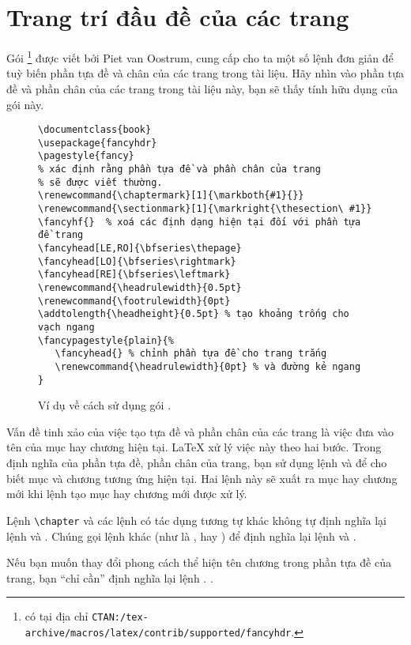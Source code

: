 \section{Trang trí đầu đề của các trang}
\label{sec:fancy} Gói \footnote{có tại địa chỉ \texttt{CTAN:/tex-archive/macros/latex/contrib/supported/fancyhdr}.} được viết bởi Piet van Oostrum, cung cấp cho ta một số lệnh đơn giản để tuỳ biến phần tựa đề và chân của các trang trong tài liệu. Hãy nhìn vào phần tựa đề và phần chân của các trang trong tài liệu này, bạn sẽ thấy tính hữu dụng của gói này.
\begin{figure}[!htbp]
\begin{lined}{\textwidth}
\begin{verbatim}
\documentclass{book}
\usepackage{fancyhdr}
\pagestyle{fancy}
% xác định rằng phần tựa đề và phần chân của trang
% sẽ được viết thường.
\renewcommand{\chaptermark}[1]{\markboth{#1}{}}
\renewcommand{\sectionmark}[1]{\markright{\thesection\ #1}}
\fancyhf{}  % xoá các định dạng hiện tại đối với phần tựa đề trang
\fancyhead[LE,RO]{\bfseries\thepage}
\fancyhead[LO]{\bfseries\rightmark}
\fancyhead[RE]{\bfseries\leftmark}
\renewcommand{\headrulewidth}{0.5pt}
\renewcommand{\footrulewidth}{0pt}
\addtolength{\headheight}{0.5pt} % tạo khoảng trống cho vạch ngang
\fancypagestyle{plain}{%
   \fancyhead{} % chỉnh phần tựa đề cho trang trắng
   \renewcommand{\headrulewidth}{0pt} % và đường kẻ ngang
}
\end{verbatim}
\end{lined}
\caption{Ví dụ về cách sử dụng gói .}
\label{fancyhdr}
\end{figure}
Vấn đề tinh xảo của việc tạo tựa đề và phần chân của các trang là việc đưa vào tên của mục hay chương hiện tại. \LaTeX{} xử lý việc này theo hai bước. Trong định nghĩa của phần tựa đề, phần chân của trang, bạn sử dụng lệnh  và  để cho biết mục và chương tương ứng hiện tại. Hai lệnh này sẽ xuất ra mục hay chương mới khi lệnh tạo mục hay chương mới được xử lý.

Lệnh \verb|\chapter| và các lệnh có tác dụng tương tự khác không tự định nghĩa lại lệnh  và . Chúng gọi lệnh khác (như là ,  hay ) để định nghĩa lại lệnh  và .

Nếu bạn muốn thay đổi phong cách thể hiện tên chương trong phần tựa đề của trang, bạn ``chỉ cần'' định nghĩa lại lệnh
. .

